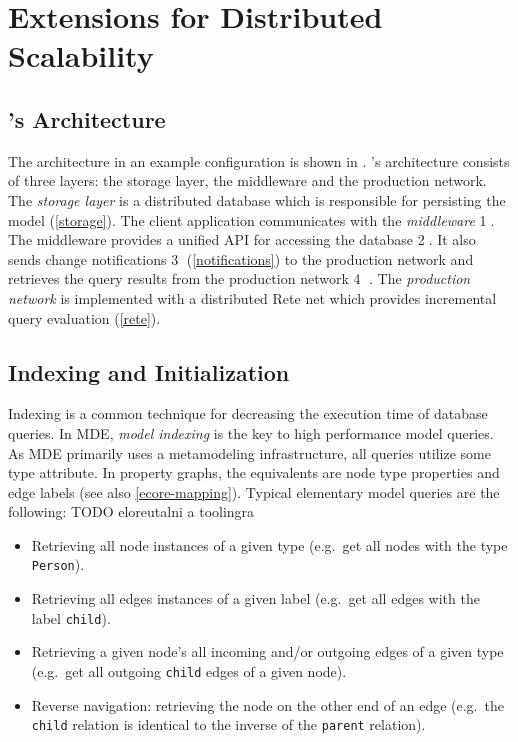 \section{Extensions for Distributed Scalability}

\subsection{\iqd{}'s Architecture}

The \iqd{} architecture in an example configuration is shown in . \iqd{}'s architecture consists of three layers: the storage layer, the middleware and the production network. 
The \emph{storage layer} is a distributed database which is responsible for persisting the model (\autoref{storage}). 
The client application communicates with the \emph{middleware} \textcircled{1}. The middleware provides a unified API for accessing the database \textcircled{2}. It also sends change notifications \textcircled{3} (\autoref{notifications}) to the production network and retrieves the query results from the production network \textcircled{4} . 
The \emph{production network} is implemented with a distributed Rete net which provides incremental query evaluation (\autoref{rete}).




\subsection{Indexing and Initialization}
\label{indexing}

Indexing is a common technique for decreasing the execution time of database queries. In MDE, \emph{model indexing} is the key to high performance model queries. As MDE primarily uses a metamodeling infrastructure, all queries utilize some type attribute. In property graphs, the equivalents are node type properties and edge labels (see also \autoref{ecore-mapping}). Typical elementary model queries are the following: TODO eloreutalni a toolingra

\begin{itemize}
  \item Retrieving all node instances of a given type (e.g.\ get all nodes with the type \texttt{Person}).
  \item Retrieving all edges instances of a given label (e.g.\ get all edges with the label \texttt{child}).
  \item Retrieving a given node's all incoming and/or outgoing edges of a given type (e.g.\ get all outgoing \texttt{child} edges of a given node). 
  \item Reverse navigation: retrieving the node on the other end of an edge (e.g.\ the \texttt{child} relation is identical to the inverse of the \texttt{parent} relation). 
\end{itemize}

